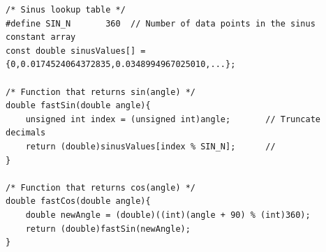 \begin{lstlisting}[style=c, caption=Implementation lookup tables., label=code:lookup_table]
/* Sinus lookup table */
#define SIN_N 		360	 // Number of data points in the sinus constant array
const double sinusValues[] = {0,0.0174524064372835,0.0348994967025010,...};

/* Function that returns sin(angle) */
double fastSin(double angle){
	unsigned int index = (unsigned int)angle;       // Truncate decimals
	return (double)sinusValues[index % SIN_N];      // 
}	

/* Function that returns cos(angle) */
double fastCos(double angle){
	double newAngle = (double)((int)(angle + 90) % (int)360);
	return (double)fastSin(newAngle);
}
\end{lstlisting}